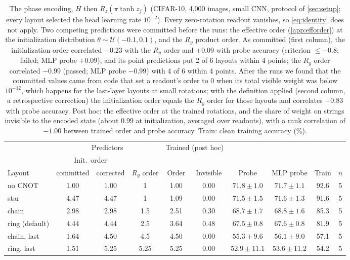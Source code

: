 \begin{table}[h]
\centering
\caption{The phase encoding, $H$ then $R_z(\pi\tanh z_j)$ (CIFAR-10, 4,000 images, small CNN, protocol of
\cref{sec:setup}; every layout selected the head learning rate $10^{-2}$). Every zero-rotation readout
vanishes, so \cref{eq:identity} does not apply. Two competing predictions were committed before the
runs: the effective order (\cref{app:efforder}) at the initialization distribution
$\theta\sim\mathcal{U}(-0.1,0.1)$, and the $R_y$ product order. As committed (first column), the
initialization order correlated $-0.23$ with the $R_y$ order and $+0.09$ with probe accuracy (criterion
$\le-0.8$; failed; MLP probe $+0.09$), and its point predictions put 2 of 6 layouts within 4 points;
the $R_y$ order correlated $-0.99$ (passed; MLP probe $-0.99$) with 4 of 6 within 4 points.
After the runs we found that the committed values came from code that set a readout's order to 0
when its total visible weight was below $10^{-12}$, which happens for the last-layer layouts at
small rotations; with the definition applied (second column, a retrospective correction) the
initialization order equals the $R_y$ order for those layouts and correlates $-0.83$ with probe
accuracy. Post hoc: the effective order at the trained rotations, and the share of weight on strings
invisible to the encoded state (about 0.99 at initialization, averaged over readouts), with a
rank correlation of $-1.00$ between trained order and probe accuracy. Train: clean training accuracy (\%).}
\label{tab:phase}
\small
\setlength{\tabcolsep}{3.5pt}
\begin{tabular}{lccccccccc}
\toprule
& \multicolumn{3}{c}{Predictors} & \multicolumn{2}{c}{Trained (post hoc)} & & & & \\
\cmidrule(lr){2-4}\cmidrule(lr){5-6}
& \multicolumn{2}{c}{Init.\ order} & & & & & & & \\
Layout & committed & corrected & $R_y$ order & Order & Invisible & Probe & MLP probe & Train & $n$ \\
\midrule
no CNOT & 1.00 & 1.00 & 1 & 1.00 & 0.00 & $71.8 \pm 1.0$ & $71.7 \pm 1.1$ & 92.6 & 5 \\
star & 4.47 & 4.47 & 1 & 1.09 & 0.00 & $71.5 \pm 1.5$ & $71.6 \pm 1.3$ & 91.6 & 5 \\
chain & 2.98 & 2.98 & 1.5 & 2.51 & 0.30 & $68.7 \pm 1.7$ & $68.8 \pm 1.6$ & 85.3 & 5 \\
ring (default) & 4.44 & 4.44 & 2.5 & 3.64 & 0.48 & $67.5 \pm 0.8$ & $67.6 \pm 0.8$ & 81.9 & 5 \\
chain, last & 1.64 & 4.50 & 4.5 & 4.50 & 0.00 & $55.3 \pm 9.6$ & $56.1 \pm 9.0$ & 57.1 & 5 \\
ring, last & 1.51 & 5.25 & 5.25 & 5.25 & 0.00 & $52.9 \pm 11.1$ & $53.6 \pm 11.2$ & 54.2 & 5 \\
\bottomrule
\end{tabular}
\end{table}

